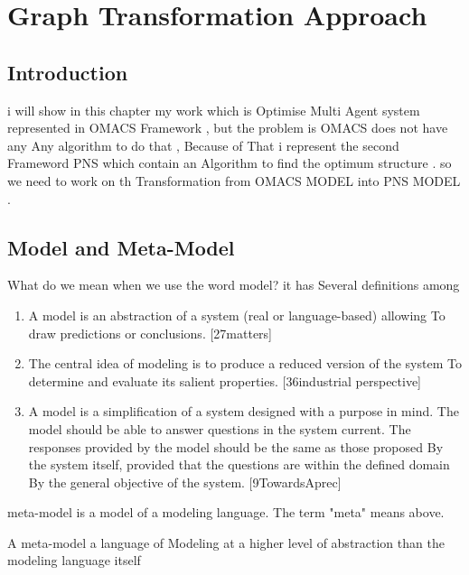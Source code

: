 
\chapter{\label{cha: Graph Transformation Approach }Graph Transformation Approach}

\section{ Introduction }
i will show in this chapter my work which is Optimise Multi Agent system  
represented in OMACS Framework , but the problem is OMACS does not have any 
Any algorithm to do that , Because of That i represent the second Frameword PNS which contain an Algorithm 
to find the optimum structure . so we need to work on th Transformation from OMACS MODEL into PNS MODEL \cite{ch3-idee}.



 
\section{Model and Meta-Model }

What do we mean when we use the word model? it has Several definitions
among

\begin{enumerate}
\item A model is an abstraction of a system (real or language-based) allowing
To draw predictions or conclusions. \cite{ch3-matters}[27matters]
\item The central idea of modeling is to produce a reduced version of the system To determine and evaluate its salient properties. \cite{ch3-selic}[36industrial perspective]

\item A model is a simplification of a system designed with a purpose in mind.
The model should be able to answer questions in the system
current. The responses provided by the model should be the same as those proposed By the system itself, provided that the questions are within the defined domain By the general objective of the system. \cite{ch3-def} [9TowardsAprec]



\end{enumerate}

meta-model is a model of a modeling language.
The term "meta" means above.

A meta-model  a language of Modeling at a higher level of abstraction than the modeling language itself
  
